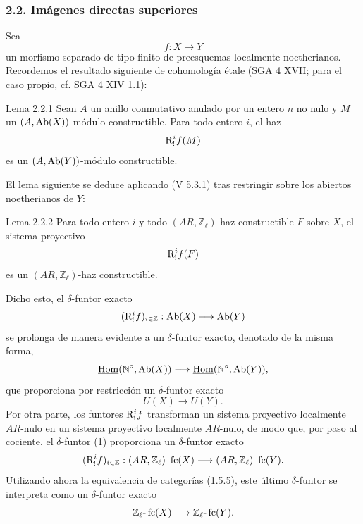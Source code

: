 \subsubsection*{2.2. Imágenes directas superiores}

Sea
\[
f:X\longrightarrow Y
\]
un morfismo separado de tipo finito de preesquemas localmente noetherianos. Recordemos el resultado siguiente de cohomología étale (SGA 4 XVII; para el caso propio, cf. SGA 4 XIV 1.1):

\begin{statement}{Lema 2.2.1}
Sean \(A\) un anillo conmutativo anulado por un entero \(n\) no nulo y \(M\) un \((A,\operatorname{Ab}(X))\)-módulo constructible. Para todo entero \(i\), el haz
\[
\mathrm{R}^i_!f(M)
\]
es un \((A,\operatorname{Ab}(Y))\)-módulo constructible.
\end{statement}

El lema siguiente se deduce aplicando (V 5.3.1) tras restringir sobre los abiertos noetherianos de \(Y\):

\begin{statement}{Lema 2.2.2}
Para todo entero \(i\) y todo \((AR,\mathbb Z_\ell)\)-haz constructible \(F\) sobre \(X\), el sistema proyectivo
\[
\mathrm{R}^i_!f(F)
\]
es un \((AR,\mathbb Z_\ell)\)-haz constructible.
\end{statement}

Dicho esto, el \(\delta\)-funtor exacto
\[
(\mathrm{R}^i_!f)_{i\in\mathbb Z}:\operatorname{Ab}(X)\longrightarrow \operatorname{Ab}(Y)
\]
se prolonga de manera evidente a un \(\delta\)-funtor exacto, denotado de la misma forma,
\[
\underline{\operatorname{Hom}}(\mathbb N^\circ,\operatorname{Ab}(X))\longrightarrow \underline{\operatorname{Hom}}(\mathbb N^\circ,\operatorname{Ab}(Y)),
\]
que proporciona por restricción un \(\delta\)-funtor exacto
\[
U(X)\longrightarrow U(Y).
\tag{1}
\]
Por otra parte, los funtores \(\mathrm{R}^i_!f\) transforman un sistema proyectivo localmente \(AR\)-nulo en un sistema proyectivo localmente \(AR\)-nulo, de modo que, por paso al cociente, el \(\delta\)-funtor (1) proporciona un \(\delta\)-funtor exacto%
\[
(\mathrm{R}^i_!f)_{i\in\mathbb Z}:(AR,\mathbb Z_\ell)\text{-}\operatorname{fc}(X)
\longrightarrow (AR,\mathbb Z_\ell)\text{-}\operatorname{fc}(Y).
\]
Utilizando ahora la equivalencia de categorías (1.5.5), este último \(\delta\)-funtor se interpreta como un \(\delta\)-funtor exacto
\[
\mathbb Z_\ell\text{-}\operatorname{fc}(X)\longrightarrow \mathbb Z_\ell\text{-}\operatorname{fc}(Y).
\]

